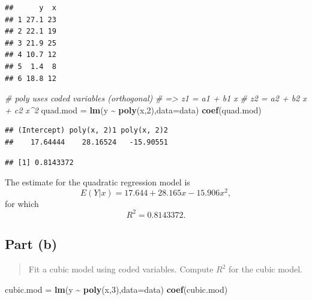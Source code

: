 \documentclass[
]{article}
\newenvironment{Shaded}{\begin{snugshade}}{\end{snugshade}}
\newcommand{\AttributeTok}[1]{\textcolor[rgb]{0.13,0.29,0.53}{#1}}
\newcommand{\CommentTok}[1]{\textcolor[rgb]{0.56,0.35,0.01}{\textit{#1}}}
\newcommand{\DecValTok}[1]{\textcolor[rgb]{0.00,0.00,0.81}{#1}}
\newcommand{\FunctionTok}[1]{\textcolor[rgb]{0.13,0.29,0.53}{\textbf{#1}}}
\newcommand{\NormalTok}[1]{#1}
\newcommand{\OtherTok}[1]{\textcolor[rgb]{0.56,0.35,0.01}{#1}}
\newcommand{\SpecialCharTok}[1]{\textcolor[rgb]{0.81,0.36,0.00}{\textbf{#1}}}
\begin{document}
\begin{verbatim}
##      y  x
## 1 27.1 23
## 2 22.1 19
## 3 21.9 25
## 4 10.7 12
## 5  1.4  8
## 6 18.8 12
\end{verbatim}

\begin{Shaded}
\begin{Highlighting}[]
\CommentTok{\# poly uses coded variables (orthogonal)}
\CommentTok{\#     =\textgreater{} z1 = a1 + b1 x}
\CommentTok{\#        z2 = a2 + b2 x + c2 x\^{}2}
\NormalTok{quad.mod }\OtherTok{=} \FunctionTok{lm}\NormalTok{(y }\SpecialCharTok{\textasciitilde{}} \FunctionTok{poly}\NormalTok{(x,}\DecValTok{2}\NormalTok{),}\AttributeTok{data=}\NormalTok{data)}
\FunctionTok{coef}\NormalTok{(quad.mod)}
\end{Highlighting}
\end{Shaded}

\begin{verbatim}
## (Intercept) poly(x, 2)1 poly(x, 2)2 
##    17.64444    28.16524   -15.90551
\end{verbatim}

\begin{Shaded}
\end{Shaded}

\begin{verbatim}
## [1] 0.8143372
\end{verbatim}

The estimate for the quadratic regression model is \[
  E(Y|x) = 17.644 + 28.165 x - 15.906 x^2,
\] for which \[
  R^2 = 0.8143372.
\]

\hypertarget{part-b-1}{%
\subsection{Part (b)}\label{part-b-1}}

\begin{quote}
Fit a cubic model using coded variables. Compute \(R^2\) for the cubic
model.
\end{quote}

\begin{Shaded}
\begin{Highlighting}[]
\NormalTok{cubic.mod }\OtherTok{=} \FunctionTok{lm}\NormalTok{(y }\SpecialCharTok{\textasciitilde{}} \FunctionTok{poly}\NormalTok{(x,}\DecValTok{3}\NormalTok{),}\AttributeTok{data=}\NormalTok{data)}
\FunctionTok{coef}\NormalTok{(cubic.mod)}
\end{Highlighting}
\end{Shaded}
\end{document}
